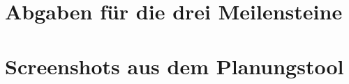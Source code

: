 
%

\chapter{Abgaben für die drei Meilensteine}



\chapter{Screenshots aus dem Planungstool}
\label{sec:planungstool}

